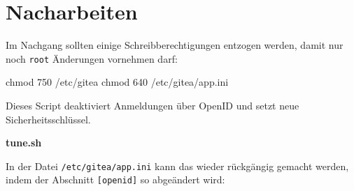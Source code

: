 \documentclass[
  letterpaper,
  DIV=11]{scrreprt}
\newenvironment{Shaded}{\begin{snugshade}}{\end{snugshade}}
\newcommand{\AttributeTok}[1]{\textcolor[rgb]{0.40,0.45,0.13}{#1}}
\newcommand{\CommentTok}[1]{\textcolor[rgb]{0.37,0.37,0.37}{#1}}
\newcommand{\ControlFlowTok}[1]{\textcolor[rgb]{0.00,0.23,0.31}{\textbf{#1}}}
\newcommand{\ExtensionTok}[1]{\textcolor[rgb]{0.00,0.23,0.31}{#1}}
\newcommand{\FunctionTok}[1]{\textcolor[rgb]{0.28,0.35,0.67}{#1}}
\newcommand{\KeywordTok}[1]{\textcolor[rgb]{0.00,0.23,0.31}{\textbf{#1}}}
\newcommand{\NormalTok}[1]{\textcolor[rgb]{0.00,0.23,0.31}{#1}}
\newcommand{\OperatorTok}[1]{\textcolor[rgb]{0.37,0.37,0.37}{#1}}
\newcommand{\StringTok}[1]{\textcolor[rgb]{0.13,0.47,0.30}{#1}}
\newcommand{\VariableTok}[1]{\textcolor[rgb]{0.07,0.07,0.07}{#1}}
\begin{document}
\section{Nacharbeiten}\label{nacharbeiten}

Im Nachgang sollten einige Schreibberechtigungen entzogen werden, damit
nur noch \texttt{root} Änderungen vornehmen darf:

\begin{Shaded}
\begin{Highlighting}[]
\FunctionTok{chmod}\NormalTok{ 750 /etc/gitea}
\FunctionTok{chmod}\NormalTok{ 640 /etc/gitea/app.ini}
\end{Highlighting}
\end{Shaded}

Dieses Script deaktiviert Anmeldungen über OpenID und setzt neue
Sicherheitsschlüssel.

\textbf{tune.sh}

\begin{Shaded}
\end{Shaded}

In der Datei \texttt{/etc/gitea/app.ini} kann das wieder rückgängig
gemacht werden, indem der Abschnitt \texttt{{[}openid{]}} so abgeändert
wird:
\end{document}
